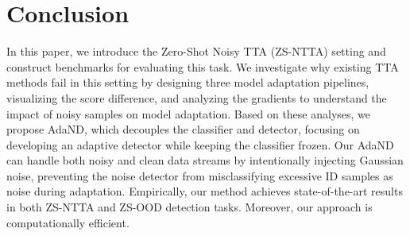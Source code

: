 \vspace{-10pt}
\section{Conclusion}\label{sec:conclusion}
\vspace{-10pt}
In this paper, we introduce the Zero-Shot Noisy TTA (ZS-NTTA) setting and construct benchmarks for evaluating this task. 
We investigate why existing TTA methods fail in this setting by designing three model adaptation pipelines, visualizing the score difference, and analyzing the gradients to understand the impact of noisy samples on model adaptation.
Based on these analyses, we propose AdaND, which decouples the classifier and detector, focusing on developing an adaptive detector while keeping the classifier frozen.
Our AdaND can handle both noisy and clean data streams by intentionally injecting Gaussian noise, preventing the noise detector from misclassifying excessive ID samples as noise during adaptation.
Empirically, our method achieves state-of-the-art results in both ZS-NTTA and ZS-OOD detection tasks. Moreover, our approach is computationally efficient.
